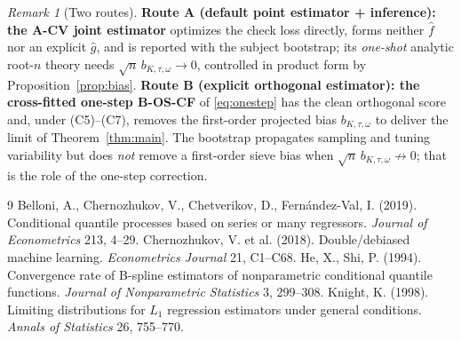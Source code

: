 \documentclass[11pt]{article}
\theoremstyle{remark}\newtheorem{remark}{Remark}
\begin{document}
\begin{remark}[Two routes]\label{rem:routes}
\textbf{Route A (default point estimator + inference): the A-CV joint
estimator} optimizes the check loss directly, forms neither $\widehat f$ nor an
explicit $\widehat g$, and is reported with the subject bootstrap; its
\emph{one-shot} analytic root-$n$ theory needs $\sqrt n\,b_{K,\tau,\omega}\to0$,
controlled in product form by Proposition~\ref{prop:bias}.
\textbf{Route B (explicit orthogonal estimator): the cross-fitted one-step
B-OS-CF} of \eqref{eq:onestep} has the clean orthogonal score and, under
(C5)--(C7), removes the first-order projected bias $b_{K,\tau,\omega}$ to deliver
the limit of Theorem~\ref{thm:main}. The bootstrap propagates sampling and
tuning variability but does \emph{not} remove a first-order sieve bias when
$\sqrt n\,b_{K,\tau,\omega}\not\to0$; that is the role of the one-step
correction.
\end{remark}

\begin{thebibliography}{9}
 Belloni, A., Chernozhukov, V.,
Chetverikov, D., Fern\'andez-Val, I. (2019). Conditional quantile processes
based on series or many regressors. \emph{Journal of Econometrics} 213, 4--29.
 Chernozhukov, V. et al.
(2018). Double/debiased machine learning. \emph{Econometrics Journal} 21,
C1--C68.
 He, X., Shi, P. (1994). Convergence rate of
B-spline estimators of nonparametric conditional quantile functions.
\emph{Journal of Nonparametric Statistics} 3, 299--308.
 Knight, K. (1998). Limiting distributions for
$L_1$ regression estimators under general conditions. \emph{Annals of Statistics}
26, 755--770.
\end{thebibliography}
\end{document}
